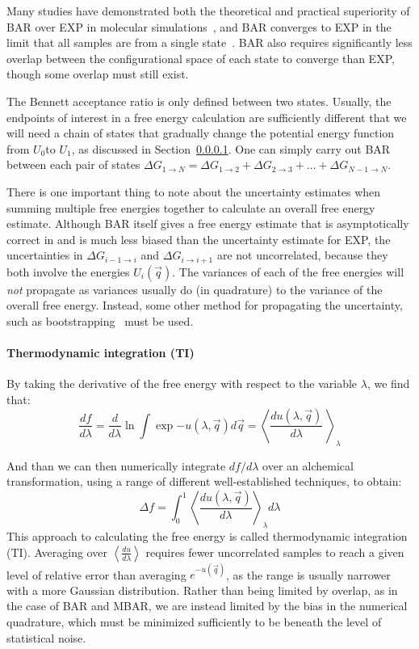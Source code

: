 \documentclass[9pt,bestpractices]{livecoms}
\newcommand{\expect}[1]{\left\langle{#1}\right\rangle}
\begin{document}
Many studies have demonstrated both the
theoretical and practical superiority of BAR over EXP in molecular
simulations~\cite{shirts2005comparison,lu2003appropriate}, and BAR converges to EXP in the limit that all samples are from a
single state~\cite{bennett1976efficient,shirts.bennett}. BAR also requires significantly less
overlap between the configurational space of each state to converge than EXP, though some overlap must still exist.

The Bennett acceptance ratio is only defined between two states.  Usually, the endpoints of interest in a free energy calculation are sufficiently different that we will need a chain of states that gradually change the potential energy function from $U_0$to $U_1$, as discussed in Section~\ref{}. One can simply carry out BAR between each pair of states $\Delta G_{1 \rightarrow N} = \Delta {G_{1\rightarrow 2}} + \Delta {G_{2\rightarrow 3}} +  \ldots + \Delta G_{N-1\rightarrow N}$.

There is one important thing to note about the uncertainty estimates when summing multiple free energies together to calculate an overall free energy estimate.  Although BAR itself gives a free energy estimate that is asymptotically correct in and is much less biased than the uncertainty estimate for EXP, the uncertainties in $\Delta {G_{i-1\rightarrow i}}$ and $\Delta {G_{i\rightarrow i+1}}$ are not uncorrelated, because they both involve the energies $U_i(\vec{q})$. The variances of each of the free energies will \textit{not} propagate as variances usually do (in quadrature) to the variance of the overall free energy. Instead, some other method for propagating the uncertainty, such as bootstrapping~\cite{Grossfield:L:2018} must be used.

\paragraph{Thermodynamic integration (TI)}

By taking the derivative of the free energy with respect to the
variable $\lambda$, we find that:
\begin{equation}
\frac{df}{d\lambda} = \frac{d}{d\lambda} \ln \int \exp{-u(\lambda,\vec{q})} d\vec{q} = \expect{\frac{du(\lambda,\vec{q})}{d\lambda}\
}_{\lambda} 
\end{equation}

And than we can then numerically integrate $df/d\lambda$ over an alchemical transformation, using a range of different well-established techniques, to obtain:
\begin{equation}
\Delta f    = \int_{0}^{1} \expect{\frac{du(\lambda,\vec{q})}{d\lambda}}_{\lambda}  d\lambda    
\end{equation}
This approach to calculating the free energy is called thermodynamic integration (TI). Averaging over $\expect{\frac{du}{d\lambda}}$ requires
fewer uncorrelated samples to reach a given level of relative error
than averaging $e^{-u(\vec{q})}$, as the range is usually
narrower with a more Gaussian distribution. Rather than being limited by overlap, as in the case of BAR and MBAR, we are instead limited by the bias in the numerical quadrature, which must be minimized sufficiently to be beneath the level of statistical noise.
\end{document}
